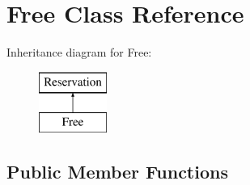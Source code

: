 \hypertarget{class_free}{}\section{Free Class Reference}
\label{class_free}
Inheritance diagram for Free\+:\begin{figure}[H]
\begin{center}
\leavevmode
\includegraphics[height=2.000000cm]{class_free}
\end{center}
\end{figure}
\subsection*{Public Member Functions}
